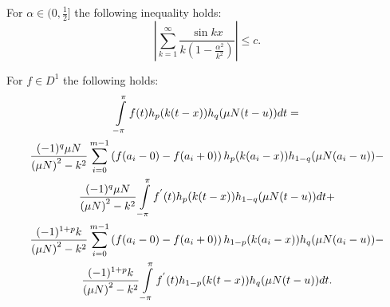 \begin{lemma} \label{sum_sin_kx2_with_alpha}
	For $\alpha \in (0, \frac{1}{2}]$ the following inequality holds:
	\begin{equation*}
	\left|
	\sum_{k=1}^{\infty} \frac{\sin kx}{k\left(1-\frac{\alpha^2}{k^2}\right)}
	\right|
	\leq 
	c.
	\end{equation*}
\end{lemma}

\begin{lemma}\label{hlemma}
	For $f \in D^1$ the following holds:
	\begin{multline}\label{hlemma_eq1}
	\intop_{-\pi}^{\pi}f(t)h_{p}(k(t-x))h_{q}(\mu N(t-u))dt= \\
	\frac{(-1)^{q}\mu N}{\left(\mu N\right)^{2}-k^{2}}\sum_{i=0}^{m-1}\left(f(a_{i}-0)-f(a_{i}+0)\right)h_{p}(k(a_{i}-x))h_{1-q}(\mu N(a_{i}-u))-\\
	\frac{(-1)^{q}\mu N}{\left(\mu N\right)^{2}-k^{2}}\intop_{-\pi}^{\pi}f^{'}(t)h_{p}(k(t-x))h_{1-q}(\mu N(t-u))dt+\\
	\frac{(-1)^{1+p}k}{\left(\mu N\right)^{2}-k^{2}}\sum_{i=0}^{m-1}\left(f(a_{i}-0)-f(a_{i}+0)\right)h_{1-p}(k(a_{i}-x))h_{q}(\mu N(a_{i}-u))-\\
	\frac{(-1)^{1+p}k}{\left(\mu N\right)^{2}-k^{2}}\intop_{-\pi}^{\pi}f^{'}(t)h_{1-p}(k(t-x))h_{q}(\mu N(t-u))dt.
	\end{multline}
\end{lemma}

